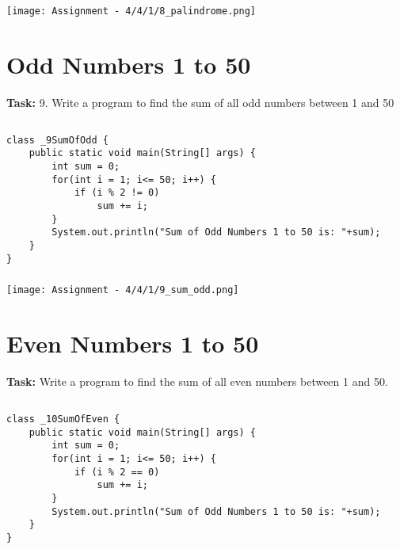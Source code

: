 \documentclass[12pt,a4paper]{article}
\begin{document}
\subsubsection{}
\begin{center}
    \texttt{[image: Assignment - 4/4/1/8\_palindrome.png]}
\end{center}

\section{Odd Numbers 1 to 50}
\textbf{Task:} 9. Write a program to find the sum of all odd numbers between 1 and 50

\subsection{}
\begin{lstlisting}
class _9SumOfOdd {
    public static void main(String[] args) {
        int sum = 0;
        for(int i = 1; i<= 50; i++) {
            if (i % 2 != 0)
                sum += i;
        }
        System.out.println("Sum of Odd Numbers 1 to 50 is: "+sum);
    }
}
\end{lstlisting}

\subsubsection{}
\begin{center}
    \texttt{[image: Assignment - 4/4/1/9\_sum\_odd.png]}
\end{center}

\section{Even Numbers 1 to 50}
\textbf{Task:} Write a program to find the sum of all even numbers between 1 and 50.

\subsection{}
\begin{lstlisting}
class _10SumOfEven {
    public static void main(String[] args) {
        int sum = 0;
        for(int i = 1; i<= 50; i++) {
            if (i % 2 == 0)
                sum += i;
        }
        System.out.println("Sum of Odd Numbers 1 to 50 is: "+sum);
    }
}
\end{lstlisting}
\end{document}
